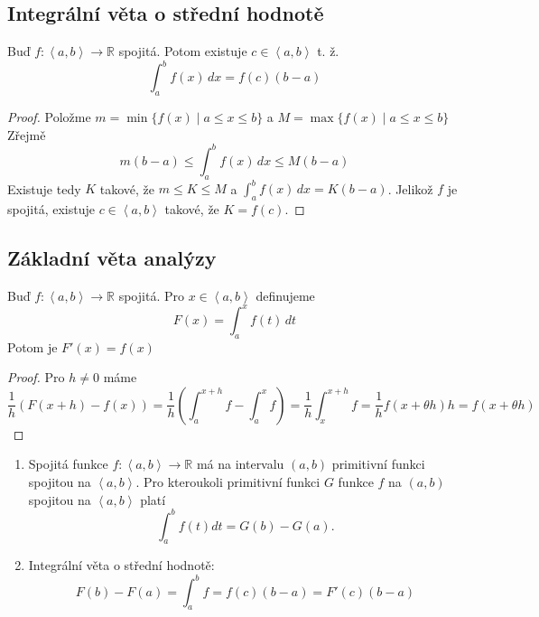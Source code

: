 \documentclass[../main.tex]{subfiles}
\begin{document}
\subsection{Integrální věta o střední hodnotě}
\begin{theorem}
	Buď $f: \left< a,b \right> \to \mathbb{R}$ spojitá. Potom existuje $c \in \left< a,b \right>$ t. ž.
	\[ \int_{a}^{b} f(x) \,dx = f(c)(b-a)\]
\end{theorem}

\begin{proof}
	Položme $m = \min \{ f(x) \mid a \leq x \leq b \}$ a $M = \max \{ f(x) \mid a \leq x \leq b \} $
	Zřejmě
	\[ m(b-a) \leq \int_{a}^{b} f(x) \,dx \leq M(b-a) \]
	Existuje tedy $K$ takové, že $m \leq K \leq M$ a $\int_{a}^{b} f(x) \,dx = K(b-a)$.
	Jelikož $f$ je spojitá, existuje $c \in \left< a,b \right>$ takové, že $K = f(c)$.
\end{proof}

\subsection{Základní věta analýzy}
\begin{theorem}
	Buď $f: \left< a,b \right> \to \mathbb{R}$ spojitá. Pro $x \in \left< a,b \right>$ definujeme
	\[ F(x) = \int_{a}^{x} f(t) \,dt \]
	Potom je $F'(x) = f(x)$
\end{theorem}

\begin{proof}
	Pro $h\neq 0$ máme
	\[ \frac{1}{h}(F(x+h) - f(x)) =\frac{1}{h}\left( \int_{a}^{x+h} f - \int_{a}^{x} f \right) =
	\frac{1}{h} \int_{x}^{x+h} f = \frac{1}{h}f(x + \theta h)h = f(x + \theta h) \]
\end{proof}

\begin{consequence}
	\hfill
	\begin{enumerate}
	    \item Spojitá funkce $f : \left<a,b\right> \rightarrow \mathbb{R}$ má na intervalu $(a,b)$ primitivní funkci spojitou na $\left<a,b\right>$.
	          Pro kteroukoli primitivní funkci $G$ funkce $f$ na $(a,b)$ spojitou na $\left<a,b\right>$ platí
	          \[\int^b_a f(t)dt = G(b) - G(a).\]
	    \item Integrální věta o střední hodnotě:
	    \[F(b) - F(a) = \int^b_a f = f(c)(b-a) = F'(c)(b-a)\]
	\end{enumerate}
\end{consequence}
\end{document}

